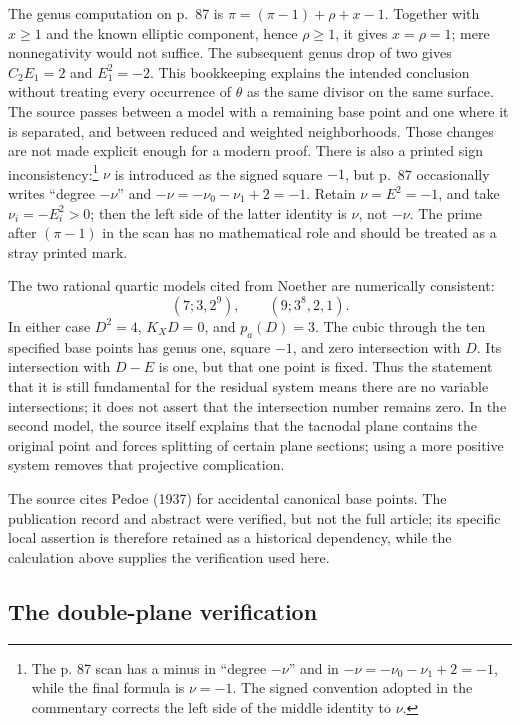 The genus computation on p.~87 is \(\pi=(\pi-1)+\rho+x-1\). Together with \(x\ge1\) and the known elliptic component, hence \(\rho\ge1\), it gives \(x=\rho=1\); mere nonnegativity would not suffice. The subsequent genus drop of two gives \(C_2E_1=2\) and \(E_1^2=-2\). This bookkeeping explains the intended conclusion without treating every occurrence of \(\theta\) as the same divisor on the same surface. The source passes between a model with a remaining base point and one where it is separated, and between reduced and weighted neighborhoods. Those changes are not made explicit enough for a modern proof. There is also a printed sign inconsistency:\footnote{The p. 87 scan has a minus in ``degree \(-\nu\)'' and in \(-\nu=-\nu_0-\nu_1+2=-1\), while the final formula is \(\nu=-1\). The signed convention adopted in the commentary corrects the left side of the middle identity to \(\nu\).} \(\nu\) is introduced as the signed square \(-1\), but p.~87 occasionally writes ``degree \(-\nu\)'' and \(-\nu=-\nu_0-\nu_1+2=-1\). Retain \(\nu=E^2=-1\), and take \(\nu_i=-E_i^2>0\); then the left side of the latter identity is \(\nu\), not \(-\nu\). The prime after \((\pi-1)\) in the scan has no mathematical role and should be treated as a stray printed mark.

The two rational quartic models cited from Noether are numerically consistent: \[
(7;3,2^9),\qquad (9;3^8,2,1).
\] In either case \(D^2=4\), \(K_XD=0\), and \(p_a(D)=3\). The cubic through the ten specified base points has genus one, square \(-1\), and zero intersection with \(D\). Its intersection with \(D-E\) is one, but that one point is fixed. Thus the statement that it is still fundamental for the residual system means there are no variable intersections; it does not assert that the intersection number remains zero. In the second model, the source itself explains that the tacnodal plane contains the original point and forces splitting of certain plane sections; using a more positive system removes that projective complication.

The source cites Pedoe (1937) for accidental canonical base points. The publication record and abstract were verified, but not the full article; its specific local assertion is therefore retained as a historical dependency, while the calculation above supplies the verification used here.

\subsection{The double-plane verification}

